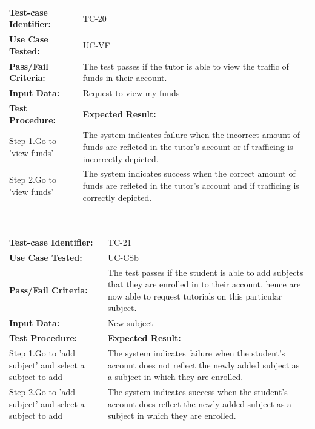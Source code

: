 \documentclass[12pt]{article}
\begin{document}
{\begin{tabular}{| p{8cm} | p{8cm} |} \hline
	\textbf{Test-case Identifier:}& TC-20\\
	\textbf{Use Case Tested:}& UC-VF\\
	\textbf{Pass/Fail Criteria:}& The test passes if the tutor is able to view the traffic of funds in their account.\\
	\textbf{Input Data:}& Request to view my funds\\\hline
	\textbf{Test Procedure:}& \textbf{Expected Result:} \\\hline
	Step 1.Go to 'view funds' & The system indicates failure when the incorrect  amount of funds are refleted in the tutor's account or if trafficing is incorrectly depicted. \\
	Step 2.Go to 'view funds' & The system indicates success when the correct  amount of funds are refleted in the tutor's account and if trafficing is correctly depicted.\\
		\hline
\end{tabular}
\\

\begin{tabular}{| p{8cm} | p{8cm} |} \hline
	\textbf{Test-case Identifier:}& TC-21\\
	\textbf{Use Case Tested:}& UC-CSb\\
	\textbf{Pass/Fail Criteria:}& The test passes if the student is able to add subjects that they are enrolled in to their account, hence are now able to request tutorials on this particular subject.\\
	\textbf{Input Data:}& New subject\\\hline
	\textbf{Test Procedure:}& \textbf{Expected Result:} \\\hline
	Step 1.Go to 'add subject' and select a subject to add& The system indicates failure when the student's account does not reflect the newly added subject as a subject in which they are enrolled. \\
	Step 2.Go to 'add subject' and select a subject to add & The system indicates success when the student's account does reflect the newly added subject as a subject in which they are enrolled.\\
		\hline
\end{tabular}
\\

}
\end{document}

